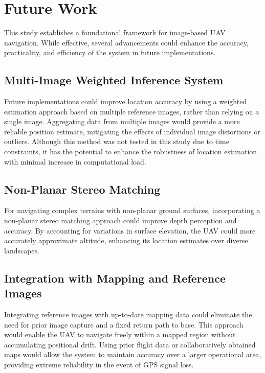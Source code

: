 

\section{Future Work}

This study establishes a foundational framework for image-based UAV navigation. While effective, several advancements could enhance the accuracy, practicality, and efficiency of the system in future implementations.

\subsection{Multi-Image Weighted Inference System}

Future implementations could improve location accuracy by using a weighted estimation approach based on multiple reference images, rather than relying on a single image. Aggregating data from multiple images would provide a more reliable position estimate, mitigating the effects of individual image distortions or outliers. Although this method was not tested in this study due to time constraints, it has the potential to enhance the robustness of location estimation with minimal increase in computational load.

\subsection{Non-Planar Stereo Matching}

For navigating complex terrains with non-planar ground surfaces, incorporating a non-planar stereo matching approach could improve depth perception and accuracy. By accounting for variations in surface elevation, the UAV could more accurately approximate altitude, enhancing its location estimates over diverse landscapes.

\subsection{Integration with Mapping and Reference Images}

Integrating reference images with up-to-date mapping data could eliminate the need for prior image capture and a fixed return path to base. This approach would enable the UAV to navigate freely within a mapped region without accumulating positional drift. Using prior flight data or collaboratively obtained maps would allow the system to maintain accuracy over a larger operational area, providing extreme reliability in the event of GPS signal loss.

